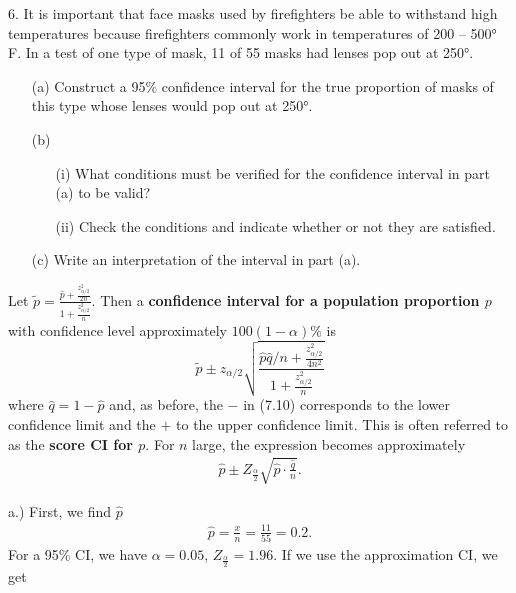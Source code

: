 \documentclass{report}
\begin{document}
\pagebreak \bigbreak \noindent 
\begin{mdframed}
6. It is important that face masks used by firefighters be able to withstand high temperatures because firefighters commonly work in temperatures of 200 – 500° F. In a test of one type of mask, 11 of 55 masks had lenses pop out at 250°.
\begin{itemize}
    \item[(a)] Construct a 95\% confidence interval for the true proportion of masks of this type whose lenses would pop out at 250°.
    \item[(b)] 
        \begin{itemize}
            \item[(i)] What conditions must be verified for the confidence interval in part (a) to be valid?
            \item[(ii)] Check the conditions and indicate whether or not they are satisfied.
        \end{itemize}
    \item[(c)] Write an interpretation of the interval in part (a).
\end{itemize}
\end{mdframed}
\bigbreak \noindent 
\begin{remark}
    Let $\tilde{p} = \frac{\hat{p} + \frac{z_{\alpha/2}^2}{2n}}{1 + \frac{z_{\alpha/2}^2}{n}}$. Then a \textbf{confidence interval for a population proportion $p$} with confidence level approximately $100(1 - \alpha)\%$ is
    \[
        \tilde{p} \pm z_{\alpha/2} \sqrt{\frac{\hat{p} \hat{q} / n + \frac{z_{\alpha/2}^2}{4n^2}}{1 + \frac{z_{\alpha/2}^2}{n}}}
    \]
    where $\hat{q} = 1 - \hat{p}$ and, as before, the $-$ in (7.10) corresponds to the lower confidence limit and the $+$ to the upper confidence limit.
    \bigbreak \noindent  
    This is often referred to as the \textbf{score CI for $p$}.
    \bigbreak \noindent 
    For $n$ large, the expression becomes approximately
    \begin{align*}
        \hat{p} \pm Z_{\frac{\alpha}{2}} \sqrt{\hat{p} \cdot \frac{\hat{q}}{n}}
    .\end{align*}

    \smiley{} 
\end{remark}
\bigbreak \noindent 
a.) First, we find $\hat{p}$
\begin{align*}
    \hat{p} = \frac{x}{n} = \frac{11}{55}   = 0.2
.\end{align*}
\bigbreak \noindent 
For a 95\% CI, we have $\alpha = 0.05$, $Z_{\frac{\alpha}{2}} = 1.96$. If we use the approximation CI, we get
\end{document}
